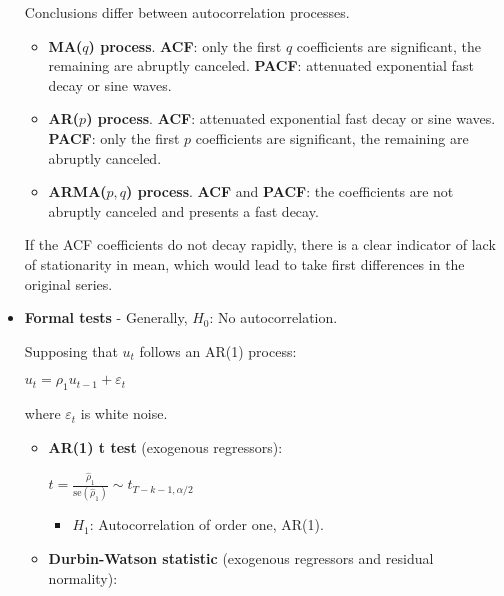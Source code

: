 \documentclass[10pt, a4paper, landscape]{article}
\newcommand{\se}{\mathrm{se}}
\begin{document}
\begin{multicols}{3}
\begin{itemize}[leftmargin=*]
			Conclusions differ between autocorrelation processes.
			
			\columnbreak
			
			\begin{itemize}[leftmargin=*]
				\item \textbf{MA($q$) process}. \textbf{ACF}: only the first $q$ coefficients are significant, the remaining are abruptly canceled. \textbf{PACF}: attenuated exponential fast decay or sine waves.
				\item \textbf{AR($p$) process}. \textbf{ACF}: attenuated exponential fast decay or sine waves. \textbf{PACF}: only the first $p$ coefficients are significant, the remaining are abruptly canceled.
				\item \textbf{ARMA($p, q$) process}. \textbf{ACF} and \textbf{PACF}: the coefficients are not abruptly canceled and presents a fast decay.
			\end{itemize}
			
			If the ACF coefficients do not decay rapidly, there is a clear indicator of lack of stationarity in mean, which would lead to take first differences in the original series.
			
			\item \textbf{Formal tests} - Generally, $H_{0}$: No autocorrelation.
			
			Supposing that $u_{t}$ follows an AR(1) process:
			
			\begin{center}
				$u_{t} = \rho_{1} u_{t - 1} + \varepsilon_{t}$
			\end{center}
			
			where $\varepsilon_{t}$ is white noise.
			
			\begin{itemize}[leftmargin=*]
				\item \textbf{AR(1) t test} (exogenous regressors):
				
				\begin{center}
					$t = \frac{\hat{\rho}_{1}}{\se(\hat{\rho}_{1})} \sim t_{T - k - 1, \alpha/2}$
				\end{center}
				
				\begin{itemize}[leftmargin=*]
					\item $H_{1}$: Autocorrelation of order one, AR(1).
				\end{itemize}
				
				\item \textbf{Durbin-Watson statistic} (exogenous regressors and residual normality):
				

\end{itemize}
\end{itemize}
\end{multicols}
\end{document}
